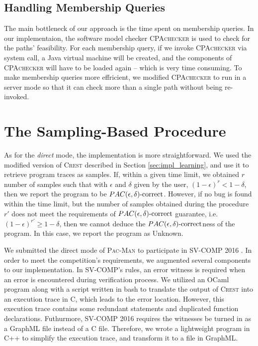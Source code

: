 \subsection{Handling Membership Queries}\label{subsec:handle_mem}

The main bottleneck of our approach is the time spent on membership queries. In our implementaion, the software model checker \textsc{CPAchecker} is used to check for the paths' feasibility. For each membership query, if we invoke \textsc{CPAchecker} via system call, a Java virtual machine will be created, and the components of \textsc{CPAchecker} will have to be loaded again -- which is very time consuming. To make membership queries more effricient, we modified \textsc{CPAchecker} to run in a server mode so that it can check more than a single path without being re-invoked. 

\section{The Sampling-Based Procedure}\label{sec:impl_sampling}

As for the \emph{direct} mode, the implementation is more straightforward. We used the modified version of \textsc{Crest} described in Section \ref{sec:impl_learning}, and use it to retrieve program traces as samples. If, within a given time limit, we obtained $r$ number of samples such that with $\epsilon$ and $\delta$ given by the user, $(1-\epsilon)^r < 1-\delta$, then we report the program to be $PAC(\epsilon, \delta)\text{-correct}$. However, if no bug is found within the time limit, but the number of samples obtained during the procedure $r'$ does not meet the requirements of $PAC(\epsilon, \delta)\text{-correct}$ guarantee, i.e. $(1-\epsilon)^{r'} \geq 1 - \delta$, then we cannot deduce the $PAC(\epsilon, \delta)\text{-correct}$ness of the program. In this case, we report the program as Unknown.

We submitted the direct mode of \textsc{Pac-Man} to participate in SV-COMP 2016 \cite{svcomp16}. In order to meet the competition's requirements, we augmented several components to our implementation. In SV-COMP's rules, an error witness is required when an error is encountered during verification process. We utilized an OCaml program along with a script written in bash to translate the output of \textsc{Crest} into an execution trace in C, which leads to the error location. However, this execution trace contains some redundant statements and duplicated function declarations. Futhurmore, SV-COMP 2016 requires the witnesses be turned in as a GraphML \cite{graphml} file instead of a C file. Therefore, we wrote a lightweight program in C++ to simplify the execution trace, and transform it to a file in GraphML. 